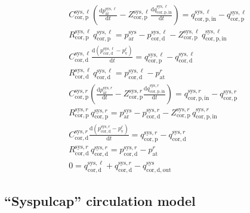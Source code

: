 \documentclass[a4paper,12pt]{report}
\begin{document}
\begin{align}
&C_{\mathrm{cor,p}}^{\mathrm{sys},\ell} \left(\frac{\mathrm{d}p_{\mathrm{ar}}^{\mathrm{sys},\ell}}{\mathrm{d}t}-Z_{\mathrm{cor,p}}^{\mathrm{sys},\ell}\frac{\mathrm{d}q_{\mathrm{cor,p,in}}^{\mathrm{sys},\ell}}{\mathrm{d}t}\right) = q_{\mathrm{cor,p,in}}^{\mathrm{sys},\ell} - q_{\mathrm{cor,p}}^{\mathrm{sys},\ell}\nonumber\\
&R_{\mathrm{cor,p}}^{\mathrm{sys},\ell}\,q_{\mathrm{cor,p}}^{\mathrm{sys},\ell}=p_{\mathrm{ar}}^{\mathrm{sys}}-p_{\mathrm{cor,d}}^{\mathrm{sys},\ell} - Z_{\mathrm{cor,p}}^{\mathrm{sys},\ell}\,q_{\mathrm{cor,p,in}}^{\mathrm{sys},\ell}\nonumber\\
&C_{\mathrm{cor,d}}^{\mathrm{sys},\ell} \frac{\mathrm{d}(p_{\mathrm{cor,d}}^{\mathrm{sys},\ell}-p_{\mathrm{v}}^{\ell})}{\mathrm{d}t} = q_{\mathrm{cor,p}}^{\mathrm{sys},\ell} - q_{\mathrm{cor,d}}^{\mathrm{sys},\ell}\nonumber\\
&R_{\mathrm{cor,d}}^{\mathrm{sys},\ell}\,q_{\mathrm{cor,d}}^{\mathrm{sys},\ell}=p_{\mathrm{cor,d}}^{\mathrm{sys},\ell}-p_{\mathrm{at}}^{r}\nonumber\\
&C_{\mathrm{cor,p}}^{\mathrm{sys},r} \left(\frac{\mathrm{d}p_{\mathrm{ar}}^{\mathrm{sys},r}}{\mathrm{d}t}-Z_{\mathrm{cor,p}}^{\mathrm{sys},r}\frac{\mathrm{d}q_{\mathrm{cor,p,in}}^{\mathrm{sys},r}}{\mathrm{d}t}\right) = q_{\mathrm{cor,p,in}}^{\mathrm{sys},r} - q_{\mathrm{cor,p}}^{\mathrm{sys},r}\nonumber\\
&R_{\mathrm{cor,p}}^{\mathrm{sys},r}\,q_{\mathrm{cor,p}}^{\mathrm{sys},r}=p_{\mathrm{ar}}^{\mathrm{sys}}-p_{\mathrm{cor,d}}^{\mathrm{sys},r} - Z_{\mathrm{cor,p}}^{\mathrm{sys},r}\,q_{\mathrm{cor,p,in}}^{\mathrm{sys},r}\nonumber\\
&C_{\mathrm{cor,d}}^{\mathrm{sys},r} \frac{\mathrm{d}(p_{\mathrm{cor,d}}^{\mathrm{sys},r}-p_{\mathrm{v}}^{\ell})}{\mathrm{d}t} = q_{\mathrm{cor,p}}^{\mathrm{sys},r} - q_{\mathrm{cor,d}}^{\mathrm{sys},r}\nonumber\\
&R_{\mathrm{cor,d}}^{\mathrm{sys},r}\,q_{\mathrm{cor,d}}^{\mathrm{sys},r}=p_{\mathrm{cor,d}}^{\mathrm{sys},r}-p_{\mathrm{at}}^{r}\nonumber\\
&0=q_{\mathrm{cor,d}}^{\mathrm{sys},\ell}+q_{\mathrm{cor,d}}^{\mathrm{sys},r}-q_{\mathrm{cor,d,out}}^{\mathrm{sys}}\nonumber
\end{align}








\subsection{``Syspulcap'' circulation model}
\end{document}
